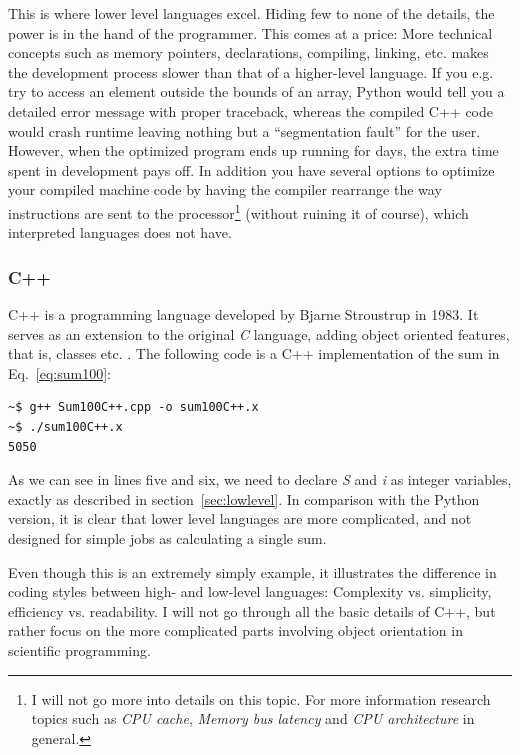 This is where lower level languages excel. Hiding few to none of the details, the power is in the hand of the programmer. This comes at a price: More technical concepts such as memory pointers, declarations, compiling, linking, etc. makes the development process slower than that of a higher-level language. If you e.g. try to access an element outside the bounds of an array, Python would tell you a detailed error message with proper traceback, whereas the compiled C++ code would crash runtime leaving nothing but a ``segmentation fault'' for the user. However, when the optimized program ends up running for days, the extra time spent in development pays off. In addition you have several options to optimize your compiled machine code by having the compiler rearrange the way instructions are sent to the processor\footnote{I will not go more into details on this topic. For more information research topics such as \textit{CPU cache}, \textit{Memory bus latency} and \textit{CPU architecture} in general.} (without ruining it of course), which interpreted languages does not have. 

\subsubsection{C++}

C++ is a programming language developed by Bjarne Stroustrup in 1983. It serves as an extension to the original \textit{C} language, adding object oriented features, that is, classes etc. \cite{ORegan}. The following code is a C++ implementation of the sum in Eq.~\ref{eq:sum100}:

\vspace{0.5 cm}


\begin{verbatim}
~$ g++ Sum100C++.cpp -o sum100C++.x
~$ ./sum100C++.x 
5050
\end{verbatim}


As we can see in lines five and six, we need to declare \textit{S} and \textit{i} as integer variables, exactly as described in section~\ref{sec:lowlevel}. In comparison with the Python version, it is clear that lower level languages are more complicated, and not designed for simple jobs as calculating a single sum.

Even though this is an extremely simply example, it illustrates the difference in coding styles between high- and low-level languages: Complexity vs. simplicity, efficiency vs. readability. I will not go through all the basic details of C++, but rather focus on the more complicated parts involving object orientation in scientific programming.


